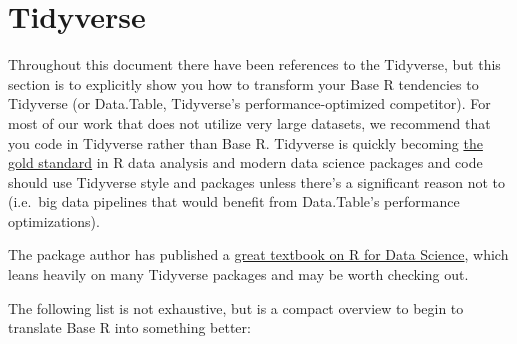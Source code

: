 \documentclass[
]{book}
\begin{document}
\section{Tidyverse}\label{tidyverse}

Throughout this document there have been references to the Tidyverse, but this section is to explicitly show you how to transform your Base R tendencies to Tidyverse (or Data.Table, Tidyverse's performance-optimized competitor). For most of our work that does not utilize very large datasets, we recommend that you code in Tidyverse rather than Base R. Tidyverse is quickly becoming \href{https://rviews.rstudio.com/2017/06/08/what-is-the-tidyverse/}{the gold standard} in R data analysis and modern data science packages and code should use Tidyverse style and packages unless there's a significant reason not to (i.e.~big data pipelines that would benefit from Data.Table's performance optimizations).

The package author has published a \href{https://r4ds.had.co.nz/}{great textbook on R for Data Science}, which leans heavily on many Tidyverse packages and may be worth checking out.

The following list is not exhaustive, but is a compact overview to begin to translate Base R into something better:
\end{document}
